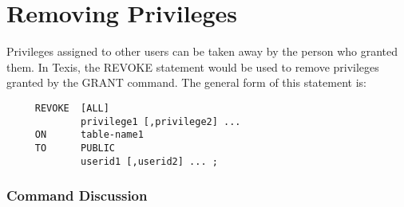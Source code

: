 %
%
%
%
%
%
%

\section{Removing Privileges}

Privileges assigned to other users can be taken away by the person who
granted them.  In Texis, the REVOKE statement would be used to remove
privileges granted by the GRANT command.  The general form of this
statement is:

\begin{verbatim}
     REVOKE  [ALL]
             privilege1 [,privilege2] ...
     ON      table-name1
     TO      PUBLIC
             userid1 [,userid2] ... ;
\end{verbatim}

\subsubsection{Command Discussion}


